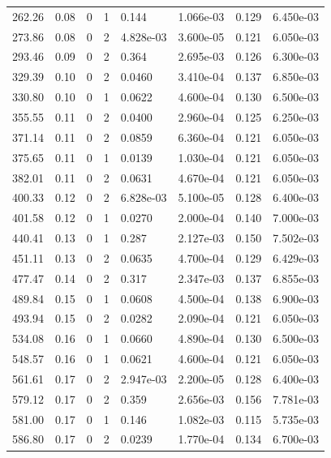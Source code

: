 \documentclass[preview]{standalone}
\begin{document}
{{\begin{tabular}{L{1.2cm}C{1.2cm} C{0.3cm}C{0.5cm} C{1.4cm}C{1.4cm} C{1.4cm}C{1.4cm}}
  262.26  &  0.08  & 0     &  1 &  0.144  & 1.066e-03  & 0.129 &  6.450e-03   \\ 
  273.86  &  0.08  & 0     &  2 &  4.828e-03  & 3.600e-05  & 0.121 &  6.050e-03   \\ 
  293.46  &  0.09  & 0     &  2 &  0.364  & 2.695e-03  & 0.126 &  6.300e-03   \\ 
  329.39  &  0.10  & 0     &  2 &  0.0460  & 3.410e-04  & 0.137 &  6.850e-03   \\ 
  330.80  &  0.10  & 0     &  1 &  0.0622  & 4.600e-04  & 0.130 &  6.500e-03   \\ 
  355.55  &  0.11  & 0     &  2 &  0.0400  & 2.960e-04  & 0.125 &  6.250e-03   \\ 
  371.14  &  0.11  & 0     &  2 &  0.0859  & 6.360e-04  & 0.121 &  6.050e-03   \\ 
  375.65  &  0.11  & 0     &  1 &  0.0139  & 1.030e-04  & 0.121 &  6.050e-03   \\ 
  382.01  &  0.11  & 0     &  2 &  0.0631  & 4.670e-04  & 0.121 &  6.050e-03   \\ 
  400.33  &  0.12  & 0     &  2 &  6.828e-03  & 5.100e-05  & 0.128 &  6.400e-03   \\ 
  401.58  &  0.12  & 0     &  1 &  0.0270  & 2.000e-04  & 0.140 &  7.000e-03   \\ 
  440.41  &  0.13  & 0     &  1 &  0.287  & 2.127e-03  & 0.150 &  7.502e-03   \\ 
  451.11  &  0.13  & 0     &  2 &  0.0635  & 4.700e-04  & 0.129 &  6.429e-03   \\ 
  477.47  &  0.14  & 0     &  2 &  0.317  & 2.347e-03  & 0.137 &  6.855e-03   \\ 
  489.84  &  0.15  & 0     &  1 &  0.0608  & 4.500e-04  & 0.138 &  6.900e-03   \\ 
  493.94  &  0.15  & 0     &  2 &  0.0282  & 2.090e-04  & 0.121 &  6.050e-03   \\ 
  534.08  &  0.16  & 0     &  1 &  0.0660  & 4.890e-04  & 0.130 &  6.500e-03   \\ 
  548.57  &  0.16  & 0     &  1 &  0.0621  & 4.600e-04  & 0.121 &  6.050e-03   \\ 
  561.61  &  0.17  & 0     &  2 &  2.947e-03  & 2.200e-05  & 0.128 &  6.400e-03   \\ 
  579.12  &  0.17  & 0     &  2 &  0.359  & 2.656e-03  & 0.156 &  7.781e-03   \\ 
  581.00  &  0.17  & 0     &  1 &  0.146  & 1.082e-03  & 0.115 &  5.735e-03   \\ 
  586.80  &  0.17  & 0     &  2 &  0.0239  & 1.770e-04  & 0.134 &  6.700e-03   \\ 

\end{tabular}}}
\end{document}
